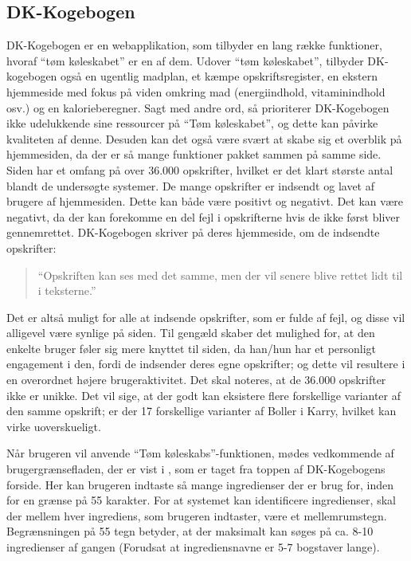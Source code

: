 \subsection{DK-Kogebogen}
\label{subsec:dk-kogebogen}

DK-Kogebogen er en webapplikation, som tilbyder en lang række funktioner, hvoraf ``tøm køleskabet'' er en af dem. Udover ``tøm køleskabet'', tilbyder DK-kogebogen også en ugentlig madplan, et kæmpe opskriftsregister, en ekstern hjemmeside med fokus på viden omkring mad (energiindhold, vitaminindhold osv.) og en kalorieberegner. Sagt med andre ord, så prioriterer DK-Kogebogen ikke udelukkende sine ressourcer på ``Tøm køleskabet'', og dette kan påvirke kvaliteten af denne. Desuden kan det også være svært at skabe sig et overblik på hjemmesiden, da der er så mange funktioner pakket sammen på samme side. Siden har et omfang på over 36.000 opskrifter, hvilket er det klart største antal blandt de undersøgte systemer. De mange opskrifter er indsendt og lavet af brugere af hjemmesiden. Dette kan både være positivt og negativt. Det kan være negativt, da der kan forekomme en del fejl i opskrifterne hvis de ikke først bliver gennemrettet. DK-Kogebogen skriver på deres hjemmeside, om de indsendte opskrifter:

\begin{quote}
``Opskriften kan ses med det samme, men der vil senere blive rettet lidt til i teksterne.'' \cite{dk-kog-indtastopskrift}
\end{quote}

Det er altså muligt for alle at indsende opskrifter, som er fulde af fejl, og disse vil alligevel være synlige på siden. Til gengæld skaber det mulighed for, at den enkelte bruger føler sig mere knyttet til siden, da han/hun har et personligt engagement i den, fordi de indsender deres egne opskrifter; og dette vil resultere i en overordnet højere brugeraktivitet. Det skal noteres, at de 36.000 opskrifter ikke er unikke. Det vil sige, at der godt kan eksistere flere forskellige varianter af den samme opskrift; \fx er der 17 forskellige varianter af Boller i Karry, hvilket kan virke uoverskueligt.

Når brugeren vil anvende ``Tøm køleskabs''-funktionen, mødes vedkommende af brugergrænsefladen, der er vist i , som er taget fra toppen af DK-Kogebogens forside. Her kan brugeren indtaste så mange ingredienser der er brug for, inden for en grænse på 55 karakter. For at systemet kan identificere ingredienser, skal der mellem hver ingrediens, som brugeren indtaster, være et mellemrumstegn. Begrænsningen på 55 tegn betyder, at der maksimalt kan søges på ca. 8-10 ingredienser af gangen (Forudsat at ingrediensnavne er 5-7 bogstaver lange).


